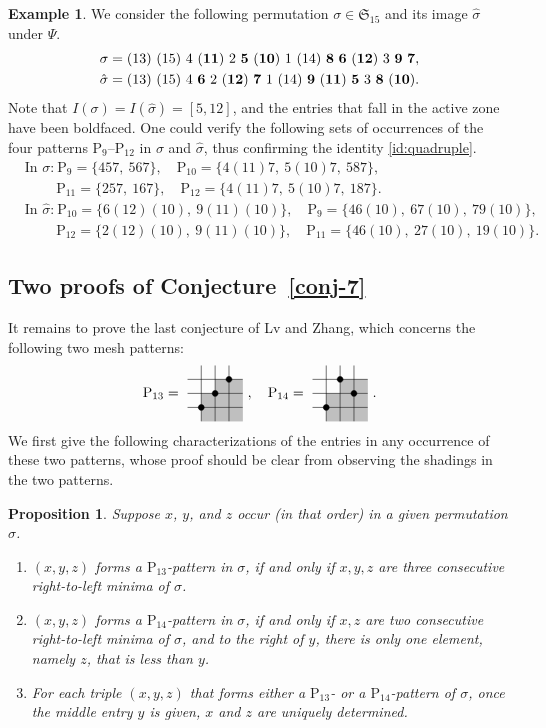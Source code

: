 \documentclass[12pt,reqno]{article}
\numberwithin{equation}{section}
\theoremstyle{plain}
\newtheorem{proposition}[theorem]{Proposition}
\theoremstyle{definition}
\newtheorem{example}[theorem]{Example}
\def\fS{\mathfrak{S}}
\def\rP{\mathrm{P}}
\newcommand{\pattern}[4]{			
	\raisebox{0.6ex}{
		\begin{tikzpicture}[scale=0.35, baseline=(current bounding box.center), #1]
			\foreach \x/\y in {#4}		\fill[gray!50] (\x,\y) rectangle +(1,1);
			
			\draw (0.01,0.01) grid (#2+0.99,#2+0.99);
			\foreach \x/\y in {#3}		\filldraw (\x,\y) circle (6pt);
	\end{tikzpicture}}
}
\begin{document}
\begin{example}\label{p9p10exa}
We consider the following permutation $\sigma\in\fS_{15}$ and its image $\hat{\sigma}$ under $\Psi$.
	\begin{align*}
		\sigma &=(13) ~(15)~ 4 ~ ({\bf11})~ 2~ {\bf5}~ ({\bf10}) ~ 1 ~ (14) ~ {\bf8} ~ {\bf6} ~ ({\bf12}) ~ 3 ~ {\bf9} ~ {\bf7},\\
		\hat{\sigma} &= (13)~(15)~4 ~{\bf6} ~2 ~({\bf12})~ {\bf7} ~ 1 ~ (14) ~ {\bf9} ~ ({\bf11}) ~ {\bf5} ~ 3 ~ {\bf8} ~ ({\bf10}).
	\end{align*}
Note that $I(\sigma)=I(\hat{\sigma})=[5,12]$, and the entries that fall in the active zone have been boldfaced. One could verify the following sets of occurrences of the four patterns $\rP_9$--$\rP_{12}$ in $\sigma$ and $\hat{\sigma}$, thus confirming the identity \eqref{id:quadruple}.
\begin{align*}
&\text{In $\sigma$:}~ \rP_{9}=\{457,~567\},\quad \rP_{10}=\{4(11)7,~5(10)7,~587\},\\ 
&\phantom{\text{in $\sigma$:}} ~\rP_{11}=\{257,~167\},\quad \rP_{12}=\{4(11)7,~5(10)7,~187\}.\\
&\text{In $\hat{\sigma}$:}~ \rP_{10}=\{6(12)(10),~9(11)(10)\},\quad \rP_{9}=\{46(10),~67(10),~79(10)\},\\
&\phantom{\text{in $\sigma$:}} ~\rP_{12}=\{2(12)(10),~9(11)(10)\},\quad \rP_{11}=\{46(10),~27(10),~19(10)\}.
\end{align*}
\end{example}



\subsection{Two proofs of Conjecture~\ref{conj-7}}
It remains to prove the last conjecture of Lv and Zhang, which concerns the following two mesh patterns:
$$\rP_{13} =\pattern{scale=1}{3}{1/1,2/2,3/3}{1/0,1/1,2/0,2/1,2/2,3/0,3/1,3/2}\ , \quad \rP_{14}=\pattern{scale=1}{3}{1/1,2/3,3/2}{1/0,1/1,2/0,2/1,2/2,3/0,3/1,3/2}\ .$$
We first give the following characterizations of the entries in any occurrence of these two patterns, whose proof should be clear from observing the shadings in the two patterns.
\begin{proposition}\label{p13p14prop}
Suppose $x$, $y$, and $z$ occur (in that order) in a given permutation $\sigma$.
	\begin{enumerate}
		\item $(x,y,z)$ forms a $\rP_{13}$-pattern in $\sigma$, if and only if $x,y,z$ are three consecutive right-to-left minima of $\sigma$.
		\item $(x,y,z)$ forms a $\rP_{14}$-pattern in $\sigma$, if and only if $x,z$ are two consecutive right-to-left minima of $\sigma$, and to the right of $y$, there is only one element, namely $z$, that is less than $y$.
		\item For each triple $(x,y,z)$ that forms either a $\rP_{13}$- or a $\rP_{14}$-pattern of $\sigma$, once the middle entry $y$ is given, $x$ and $z$ are uniquely determined.
	\end{enumerate}
\end{proposition}
\end{document}
